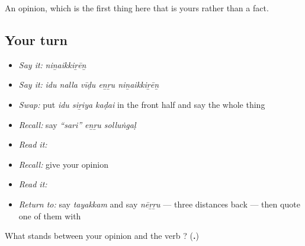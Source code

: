 \begin{grammarlens}[title={What you've built}]
An opinion, which is the first thing here that is yours rather than a fact.
\end{grammarlens}

\subsection*{Your turn}
\begin{itemize}
\raggedright
  \item \emph{Say it:} \emph{niṉaikkiṟēṉ}
  \item \emph{Say it:} \emph{idu nalla vīḍu eṉṟu niṉaikkiṟēṉ}
  \item \emph{Swap:} put \emph{idu siṟiya kaḍai} in the front half and say the whole thing
  \item \emph{Recall:} say \emph{\textquotedblleft{}sari\textquotedblright{} eṉṟu solluṅgaḷ}
  \item \emph{Read it:} \textbf{}
  \item \emph{Recall:} give your opinion
  \item \emph{Read it:} \textbf{}
  \item \emph{Return to:} say \emph{tayakkam} and say \emph{nēṟṟu} — three distances back — then quote one of them with 
\end{itemize}

\begin{tcolorbox}[breakable,colback=teal!4,colframe=teal!35!black,title={Before you move on}]
What stands between your opinion and the verb ? (\textbf{.})
\end{tcolorbox}
